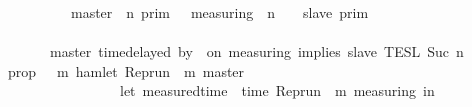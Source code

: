 \begin{isabellebody}
{}\isanewline
\ \ \ \ \ \ \ \ {\isasymunion}\ {\isacharparenleft}{\isasymlbrakk}\ master\ {\isasymUp}\ n\ {\isasymrbrakk}\isactrlsub p\isactrlsub r\isactrlsub i\isactrlsub m\ {\isasyminter}\ {\isasymlbrakk}\ measuring\ {\isacharat}\ n\ {\isasymoplus}\ {\isasymdelta}{\isasymtau}\ {\isasymRightarrow}\ slave\ {\isasymrbrakk}\isactrlsub p\isactrlsub r\isactrlsub i\isactrlsub m{\isacharparenright}{\isacharparenright}\isanewline
\ \ \ \ \ \ \ \ \ \ \ \ \ \ \ \ \ \ \ \ \ \ \ \ \ \ \ \ \ \ \ \ \ \ \ \ \ \ \ \ \ \ \ \ \ %
\isanewline
\ \ \ \ \ {\isasyminter}\ {\isasymlbrakk}\ master\ time{\isacharminus}delayed\ by\ {\isasymdelta}{\isasymtau}\ on\ measuring\ implies\ slave\ {\isasymrbrakk}\isactrlsub T\isactrlsub E\isactrlsub S\isactrlsub L\isactrlbsup {\isasymge}\ Suc\ n\isactrlesup {\isacartoucheclose}\isanewline
%
\isadelimproof
%
\endisadelimproof
%
\isatagproof
{}\isamarkupfalse%
\ {\isacharminus}\isanewline
\ \ \isamarkupfalse%
\ {\isacharquery}prop\ {\isacharequal}\ {\isacartoucheopen}{\isasymlambda}{\isasymrho}\ m{\isachardot}\ hamlet\ {\isacharparenleft}{\isacharparenleft}Rep{\isacharunderscore}run\ {\isasymrho}{\isacharparenright}\ m\ master{\isacharparenright}\ {\isasymlongrightarrow}\isanewline
\ \ \ \ \ \ \ \ \ \ \ \ \ \ \ \ \ {\isacharparenleft}let\ measured{\isacharunderscore}time\ {\isacharequal}\ time\ {\isacharparenleft}{\isacharparenleft}Rep{\isacharunderscore}run\ {\isasymrho}{\isacharparenright}\ m\ measuring{\isacharparenright}\ in\isanewline

\end{isabellebody}
